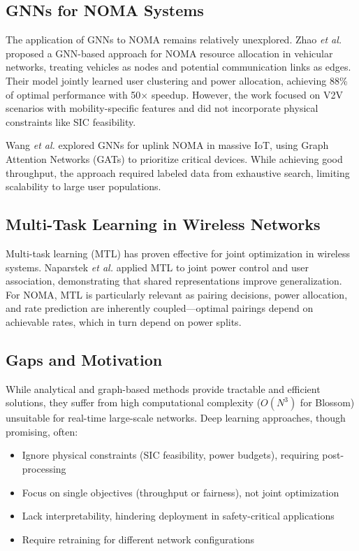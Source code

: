 \subsection{GNNs for NOMA Systems}

The application of GNNs to NOMA remains relatively unexplored. Zhao \textit{et al.} \cite{zhao2020deep} proposed a GNN-based approach for NOMA resource allocation in vehicular networks, treating vehicles as nodes and potential communication links as edges. Their model jointly learned user clustering and power allocation, achieving 88\% of optimal performance with 50× speedup. However, the work focused on V2V scenarios with mobility-specific features and did not incorporate physical constraints like SIC feasibility.

Wang \textit{et al.} \cite{wang2021graph} explored GNNs for uplink NOMA in massive IoT, using Graph Attention Networks (GATs) to prioritize critical devices. While achieving good throughput, the approach required labeled data from exhaustive search, limiting scalability to large user populations.

\subsection{Multi-Task Learning in Wireless Networks}

Multi-task learning (MTL) has proven effective for joint optimization in wireless systems. Naparstek \textit{et al.} \cite{naparstek2019deep} applied MTL to joint power control and user association, demonstrating that shared representations improve generalization. For NOMA, MTL is particularly relevant as pairing decisions, power allocation, and rate prediction are inherently coupled—optimal pairings depend on achievable rates, which in turn depend on power splits.

\subsection{Gaps and Motivation}

While analytical and graph-based methods provide tractable and efficient solutions, they suffer from high computational complexity ($O(N^3)$ for Blossom) unsuitable for real-time large-scale networks. Deep learning approaches, though promising, often:

\begin{itemize}
    \item Ignore physical constraints (SIC feasibility, power budgets), requiring post-processing
    \item Focus on single objectives (throughput or fairness), not joint optimization
    \item Lack interpretability, hindering deployment in safety-critical applications
    \item Require retraining for different network configurations
\end{itemize}

